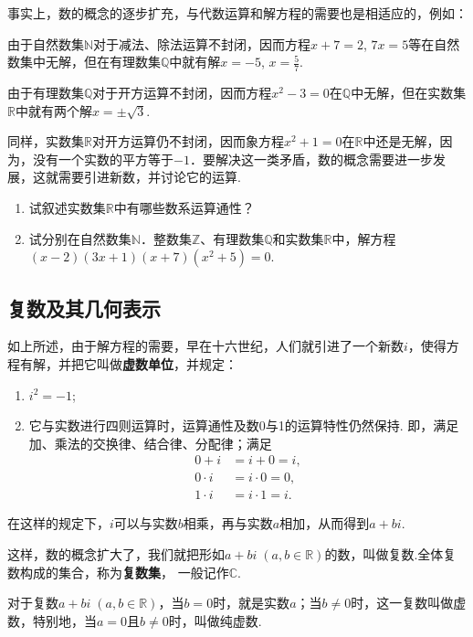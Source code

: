 事实上，数的概念的逐步扩充，与代数运算和解方程的需要也是相适应的，例如：

由于自然数集$\mathbb{N}$对于减法、除法运算不封闭，因而方程$x+7=2$, $7x=5$等在自然数集中无解，但在有理数集$\mathbb{Q}$中就有解$x=-5$, $x=\frac{5}{7}$. 

由于有理数集$\mathbb{Q}$对于开方运算不封闭，因而方程$x^2-3
=0$在$\mathbb{Q}$中无解，但在实数集$\mathbb{R}$中就有两个解$x=\pm\sqrt{3}$.

同样，实数集$\mathbb{R}$对开方运算仍不封闭，因而象方程$x^2+1=0$在$\mathbb{R}$中还是无解，因为，没有一个实数的平方等于$-1$．要解决这一类矛盾，数的概念需要进一步发展，这就需要引进新数，并讨论它的运算.

\begin{ex}
\begin{enumerate}
    \item 试叙述实数集$\mathbb{R}$中有哪些数系运算通性？
\item 试分别在自然数集$\mathbb{N}$．整数集$\mathbb{Z}$、有理数集$\mathbb{Q}$和实数集$\mathbb{R}$中，解方程$(x-2)(3x+1)(x+7)(x^2+5)=0$.
\end{enumerate}
\end{ex}

\subsection{复数及其几何表示}
如上所述，由于解方程的需要，早在十六世纪，人们就引进了一个新数$i$，使得方程有解，并把它叫做\textbf{虚数单位}，并规定：
\begin{enumerate}[(1)]
\item $i^2=-1$;
\item 它与实数进行四则运算时，运算通性及数0与1的运算特性仍然保持. 即，满足加、乘法的交换律、结合律、分配律；满足
\[\begin{split}
    0+i&=i+0=i,\\
0\cdot i&=i\cdot 0=0,\\
1\cdot i&=i\cdot 1=i.
\end{split}\]
\end{enumerate}

在这样的规定下，$i$可以与实数$b$相乘，再与实数$a$相加，从而得到$a+bi$.

这样，数的概念扩大了，我们就把形如$a+bi\; (a,b\in\mathbb{R})$的数，叫做复数.全体复数构成的集合，称为\textbf{复数集}，
一般记作$\mathbb{C}$.

对于复数$a+bi\; (a,b\in\mathbb{R})$，当$b=0$时，就是实数$a$；当$b\ne 0$时，这一复数叫做虚数，特别地，当$a=0$且$b\ne 0$时，叫做纯虚数.

